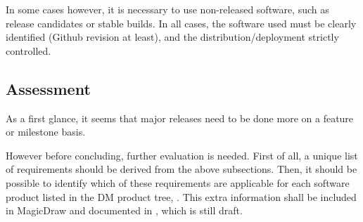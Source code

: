 In some cases however, it is necessary to use non-released software, such as release candidates or stable builds.
In all cases, the software used must be clearly identified (Github revision at least), and the distribution/deployment strictly controlled.


\subsection{Assessment} \label{sec:assessment}

As a first glance, it seems that major releases need to be done more on a feature or milestone basis.

However before concluding, further evaluation is needed.
First of all, a unique list of requirements should be derived from the above subsections. 
Then, it should be possible to identify which of these requirements are applicable for each software product listed in the \gls{DM} product tree, .
This extra information shall be included in MagicDraw and documented in , which is still draft.


